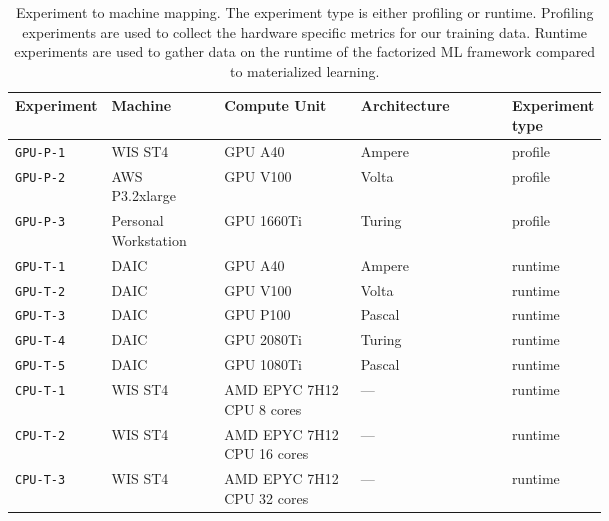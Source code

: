 \begin{table}[ht]
  \centering
  \begin{tabular}{p{0.12\linewidth}p{0.19\linewidth}p{0.23\linewidth}lp{0.15\linewidth}}
    \toprule
    Experiment       & Machine              & Compute Unit               & Architecture & Experiment type \\
    \midrule
    \midrule
    \texttt{GPU-P-1} & WIS ST4              & GPU A40                    & Ampere       & profile         \\
    \texttt{GPU-P-2} & AWS P3.2xlarge       & GPU V100                   & Volta        & profile         \\
    \texttt{GPU-P-3} & Personal Workstation & GPU 1660Ti                 & Turing       & profile         \\
    \texttt{GPU-T-1} & DAIC                 & GPU A40                    & Ampere       & runtime         \\
    \texttt{GPU-T-2} & DAIC                 & GPU V100                   & Volta        & runtime         \\
    \texttt{GPU-T-3} & DAIC                 & GPU P100                   & Pascal       & runtime         \\
    \texttt{GPU-T-4} & DAIC                 & GPU 2080Ti                 & Turing       & runtime         \\
    \texttt{GPU-T-5} & DAIC                 & GPU 1080Ti                 & Pascal       & runtime         \\
    \texttt{CPU-T-1} & WIS ST4              & AMD EPYC 7H12 CPU 8 cores  & —            & runtime         \\
    \texttt{CPU-T-2} & WIS ST4              & AMD EPYC 7H12 CPU 16 cores & —            & runtime         \\
    \texttt{CPU-T-3} & WIS ST4              & AMD EPYC 7H12 CPU 32 cores & —            & runtime         \\
    \bottomrule
  \end{tabular}
  \caption[Experiment to machine mapping]{Experiment to machine mapping. The experiment type is either profiling or runtime. Profiling experiments are used to collect the hardware specific metrics for our training data. Runtime experiments are used to gather data on the runtime of the factorized ML framework compared to materialized learning.}
  \label{tab:6-hardware-overview}
\end{table}

